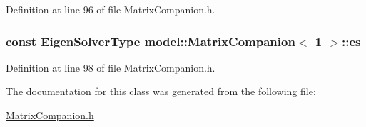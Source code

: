 Definition at line 96 of file Matrix\+Companion.\+h.

\hypertarget{classmodel_1_1_matrix_companion_3_011_01_4_a3391410a043a5ef06a5db7ee4d2e3de5}{}
\subsubsection[{es}]{\setlength{\rightskip}{0pt plus 5cm}const Eigen\+Solver\+Type {\bf model\+::\+Matrix\+Companion}$<$ 1 $>$\+::es}\label{classmodel_1_1_matrix_companion_3_011_01_4_a3391410a043a5ef06a5db7ee4d2e3de5}


Definition at line 98 of file Matrix\+Companion.\+h.



The documentation for this class was generated from the following file\+:\begin{DoxyCompactItemize}
\item 
\hyperlink{_matrix_companion_8h}{Matrix\+Companion.\+h}\end{DoxyCompactItemize}
